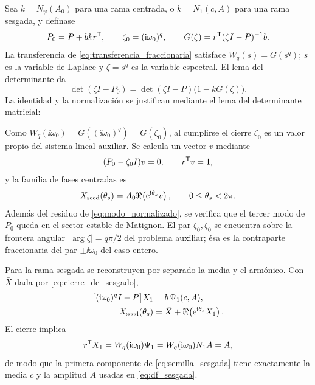 Sea \(k=N_\psi(A_0)\) para una rama centrada, o
\(k=N_1(c,A)\) para una rama sesgada, y defínase
\begin{equation}
P_0=P+bkr^{\mathsf T},\qquad
\zeta_0=(\mathrm{i}\omega_0)^q,\qquad
G(\zeta)=r^{\mathsf T}(\zeta I-P)^{-1}b.
\label{eq:matriz_auxiliar}
\end{equation}
La transferencia de \cref{eq:transferencia_fraccionaria} satisface
\(W_q(s)=G(s^q)\); \(s\) es la variable de Laplace y
\(\zeta=s^q\) es la variable espectral.
El lema del determinante da
\begin{equation}
\det(\zeta I-P_0)
=\det(\zeta I-P)\bigl(1-kG(\zeta)\bigr).
\label{eq:identidad_modal}
\end{equation}
La identidad y la normalización se justifican mediante el lema del
determinante matricial:
\begingroup
\def\HAFOderivationpart{9}

\endgroup
Como
\(W_q(\ii\omega_0)=G((\ii\omega_0)^q)=G(\zeta_0)\), al cumplirse el cierre
\(\zeta_0\) es un valor propio del sistema lineal auxiliar. Se calcula un
vector \(v\) mediante
\begin{equation}
(P_0-\zeta_0I)v=0,\qquad r^{\mathsf T}v=1,
\label{eq:modo_normalizado}
\end{equation}
y la familia de fases centradas es
\begin{equation}
X_{\mathrm{seed}}(\theta_s)
=A_0\Re\!\left(\mathrm e^{\mathrm{i}\theta_s}v\right),
\qquad 0\leq\theta_s<2\pi.
\label{eq:semilla_modal}
\end{equation}
Además del residuo de \cref{eq:modo_normalizado}, se verifica que el tercer
modo de \(P_0\) queda en el sector estable de Matignon. El par
\(\zeta_0,\overline{\zeta_0}\) se encuentra sobre la frontera angular
\(|\arg\zeta|=q\pi/2\) del problema auxiliar; ésa es la contraparte
fraccionaria del par \(\pm\ii\omega_0\) del caso entero.

Para la rama sesgada se reconstruyen por separado la media y el armónico. Con
\(\bar X\) dada por \cref{eq:cierre_dc_sesgado},
\begin{equation}
\begin{aligned}
\bigl[(\mathrm{i}\omega_0)^qI-P\bigr]X_1
&=b\,\Psi_1(c,A),\\
X_{\mathrm{seed}}(\theta_s)
&=\bar X+\Re\!\left(\mathrm e^{\mathrm{i}\theta_s}X_1\right).
\end{aligned}
\label{eq:semilla_sesgada}
\end{equation}
El cierre implica
\[
r^{\mathsf T}X_1=W_q(\mathrm{i}\omega_0)\Psi_1
=W_q(\mathrm{i}\omega_0)N_1A=A,
\]
de modo que la primera componente de
\cref{eq:semilla_sesgada} tiene exactamente la media \(c\) y la amplitud
\(A\) usadas en \cref{eq:df_sesgada}.

